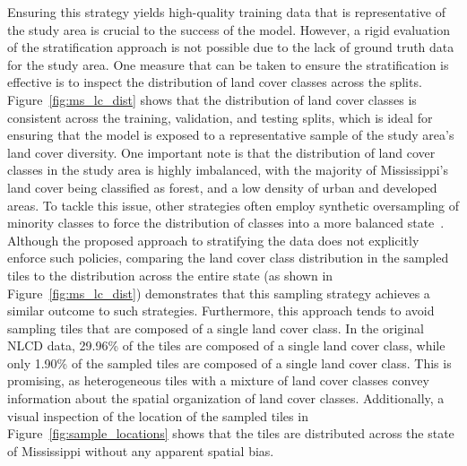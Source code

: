 

Ensuring this strategy yields high-quality training data that is representative of the study area is crucial to the success of the model.
However, a rigid evaluation of the stratification approach is not possible due to the lack of ground truth data for the study area.
One measure that can be taken to ensure the stratification is effective is to inspect the distribution of land cover classes across the splits.
Figure~\ref{fig:ms_lc_dist} shows that the distribution of land cover classes is consistent across the training, validation, and testing splits, which is ideal for ensuring that the model is exposed to a representative sample of the study area's land cover diversity.
One important note is that the distribution of land cover classes in the study area is highly imbalanced, with the majority of Mississippi's land cover being classified as forest, and a low density of urban and developed areas. 
To tackle this issue, other strategies often employ synthetic oversampling of minority classes to force the distribution of classes into a more balanced state~\cite{douzasImbalancedLearningLand2019, fonsecaImprovingImbalancedLand2021}.
Although the proposed approach to stratifying the data does not explicitly enforce such policies, comparing the land cover class distribution in the sampled tiles to the distribution across the entire state (as shown in Figure~\ref{fig:ms_lc_dist}) demonstrates that this sampling strategy achieves a similar outcome to such strategies.
Furthermore, this approach tends to avoid sampling tiles that are composed of a single land cover class. 
In the original NLCD data, 29.96\% of the tiles are composed of a single land cover class, while only 1.90\% of the sampled tiles are composed of a single land cover class.
This is promising, as heterogeneous tiles with a mixture of land cover classes convey information about the spatial organization of land cover classes.
Additionally, a visual inspection of the location of the sampled tiles in Figure~\ref{fig:sample_locations} shows that the tiles are distributed across the state of Mississippi without any apparent spatial bias.


